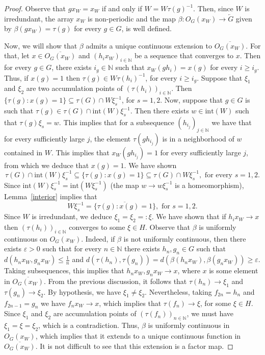 \documentclass[titlepage,reqno,10pt]{amsart}
\theoremstyle{definition}
\begin{document}
\begin{proof}
Observe that $gx_W=x_W$ if and only if $W=W\tau(g)^{-1}$. Then, since $W$ is irredundant,  the array $x_W$ is non-periodic and the map $\beta: O_G(x_W)\to \overleftarrow{G}$ given by $\beta(gx_W)=\tau(g)$ for every $g\in G$, is well defined.

 Now, we will show that $\beta$ admits a unique continuous extension to $\overline{O_G(x_W)}$. For that, let $x\in \overline{O_G(x_W)}$ and $(h_ix_W)_{i\in\mathbb{N}}$ be a sequence that converges to $x$. Then for every $g\in G$, there exists $i_g\in\mathbb{N}$ such that $x_W(gh_i)=x(g)$ for every $i\geq i_g$. Thus, if $x(g)=1$ then $\tau(g)\in W\tau(h_i)^{-1}$, for every $i\geq i_g$. Suppose that $\xi_1$ and $\xi_2$ are two accumulation points of $(\tau(h_i))_{i\in\mathbb{N}}$. Then $\{\tau(g): x(g)=1\}\subseteq \tau(G)\cap W\xi_s^{-1}$, for $s=1,2$. Now, suppose that $g\in G$ is such that  $\tau(g)\in \tau(G)\cap \mathrm{int}(W)\xi_s^{-1}$. Then there exists $w\in \mathrm{int}(W)$  such that $\tau(g)\xi_s=w$. This implies that for a subsequence $(h_{i_j})_{j\in\mathbb{N}}$ we have that for every sufficiently large $j$, the element $\tau(gh_{i_j})$ is in a neighborhood of $w$ contained in $W$. This implies that $x_W(gh_{i_j})=1$ for every sufficiently large $j$, from which we deduce that $x(g)=1$. We have shown
 \begin{equation}\label{eq-1}
 \tau(G)\cap \mathrm{int}(W)\xi_s^{-1}\subseteq \{\tau(g): x(g)=1\}\subseteq \tau(G)\cap W\xi_s^{-1}, \mbox{ for every } s=1,2.
 \end{equation}
 Since $\mathrm{int}(W)\xi_s^{-1}=\mathrm{int}(W\xi_s^{-1})$ (the map $w\to w\xi_s^{-1}$ is a homeomorphism), Lemma~\ref{interior} implies that
$$  
 W\xi_s^{-1}=\overline{\{\tau(g): x(g)=1\}}, \mbox{ for } s=1,2.
$$
 Since $W$ is irredundant, we deduce $\xi_1=\xi_2=:\xi$. 
 We have shown that if $h_ix_W\to x$ then $(\tau(h_i))_{i\in\mathbb{N}}$ converges to some $\xi\in H$. Observe that $\beta$ is uniformly continuous on $O_G(x_W)$. Indeed, if  $\beta$ is not uniformly continuous, then there exists $\varepsilon>0$ such that for every $n\in\mathbb{N}$ there exists $h_n, g_n\in G$ such that $d(h_nx_W,g_nx_W)\leq \frac{1}{n}$ and $d(\tau(h_n),\tau(g_n)) =d(\beta(h_nx_W), \beta(g_nx_W))\geq \varepsilon.$ Taking subsequences, this implies that $h_nx_W, g_nx_W\to x$, where $x$ is some element in $\overline{O_G(x_W)}$. From the previous discussion, it follows that $\tau(h_n)\to \xi_1$ and $\tau(g_n)\to \xi_2$. By hypothesis, we have $\xi_1\neq \xi_2$. Nevertheless, taking $f_{2n}=h_n$ and $f_{2n-1}=g_n$ we have $f_nx_W\to x$, which implies that  $\tau(f_n)\to \xi$, for some $\xi\in H$. Since $\xi_1$ and $\xi_2$ are accumulation points of $(\tau(f_n))_{n\in\mathbb{N}}$, we must have $\xi_1=\xi=\xi_2$, which is a contradiction.  Thus, $\beta$ is uniformly continuous in $O_G(x_W)$, which implies that it extends to a unique continuous function in $\overline{O_G(x_W)}$. It is not difficult to see that this extension is a factor map.   


\end{proof}
\end{document}
